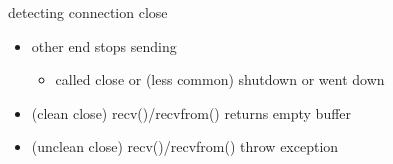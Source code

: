 \begin{frame}{detecting connection close}
    \begin{itemize}
    \item other end stops sending
        \begin{itemize}
        \item called close or (less common) shutdown or went down
        \end{itemize}
    \item (clean close) recv()/recvfrom() returns empty buffer
    \item (unclean close) recv()/recvfrom() throw exception
    \end{itemize}
\end{frame}
